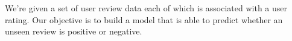 We're given a set of user review data each of which is associated
with a user rating. Our objective is to build a model that is able
to predict whether an unseen review is positive or negative.
